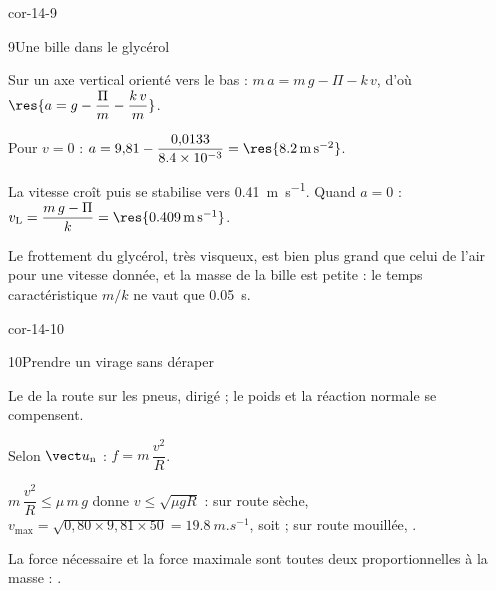 \begin{blocLivre}{cor-14-9}
\begin{corrige}{9}{Une bille dans le glycérol}
\begin{questions}
\item Sur un axe vertical orienté vers le bas : $m\,a=m\,g-\Pi-k\,v$, d'où $\res{a=g-\dfrac{\Pi}{m}-\dfrac{k\,v}{m}}$.
\item Pour $v=0$ : $a=9{,}81-\dfrac{0{,}0133}{\num{8.4e-3}}=\res{\qty{8,2}{m.s^{-2}}}$.
\item La vitesse croît puis se stabilise vers \qty{0,41}{m.s^{-1}}. Quand $a=0$ :
$v_\mathrm{L}=\dfrac{m\,g-\Pi}{k}=\res{\qty{0,409}{m.s^{-1}}}$.
\item Le frottement du glycérol, très visqueux, est bien plus grand que celui de l'air pour une vitesse donnée, et la
masse de la bille est petite : le temps caractéristique $m/k$ ne vaut que \qty{0,05}{s}.
\end{questions}
\end{corrige}
\end{blocLivre}
\begin{blocLivre}{cor-14-10}
\begin{corrige}{10}{Prendre un virage sans déraper}
\begin{questions}
\item Le  de la route sur les pneus, dirigé  ; le
poids et la réaction normale se compensent.
\item Selon $\un$ : $f=m\,\dfrac{v^2}{R}$.
\item $m\,\dfrac{v^2}{R}\leq\mu\,m\,g$ donne $v\leq\sqrt{\mu g R}$ : sur route sèche,
$v_{\max}=\sqrt{0{,}80\times9{,}81\times50}=\qty{19,8}{m.s^{-1}}$, soit  ; sur route mouillée,
.
\item La force nécessaire et la force maximale sont toutes deux proportionnelles à la masse : .
\end{questions}
\end{corrige}
\end{blocLivre}
